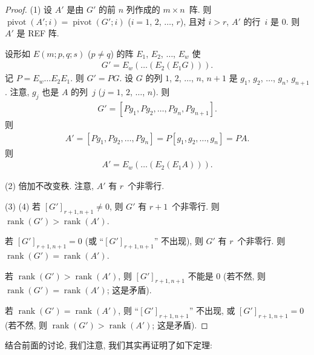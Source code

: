 \documentclass[../libro.tex]{subfiles}
\begin{document}
\begin{proof}
    (1)
    设 \(A'\) 是由 \(G'\) 的前 \(n\) 列作成的 \(m \times n\)~阵.
    则
    \(\operatorname{pivot} {(A'; i)} = \operatorname{pivot} {(G'; i)}\)
    (\(i = 1\), \(2\), \(\dots\), \(r\)),
    且对 \(i > r\),
    \(A'\) 的行~\(i\) 是 \(0\).
    则 \(A'\) 是 REF 阵.

    设形如 \(E(m; p, q; s)\) (\(p \neq q\)) 的阵
    \(E_1\), \(E_2\), \(\dots\), \(E_w\) 使
    \begin{align*}
        G' = E_w (\dots (E_2 (E_1 G))).
    \end{align*}
    记 \(P = E_w \dots E_2 E_1\).
    则 \(G' = P G\).
    设 \(G\) 的列
    \(1\), \(2\), \(\dots\), \(n\), \(n+1\)
    是 \(g_1\), \(g_2\), \(\dots\), \(g_n\), \(g_{n+1}\).
    注意, \(g_j\) 也是 \(A\) 的列~\(j\)
    (\(j = 1\), \(2\), \(\dots\), \(n\)).
    则
    \begin{align*}
        G' = [P g_1, P g_2, \dots, P g_n, P g_{n+1}].
    \end{align*}
    则
    \begin{align*}
        A'
        = [P g_1, P g_2, \dots, P g_n]
        = P [g_1, g_2, \dots, g_n]
        = P A.
    \end{align*}
    则
    \begin{align*}
        A' = E_w (\dots (E_2 (E_1 A))).
    \end{align*}

    (2)
    倍加不改变秩.
    注意, \(A'\) 有 \(r\)~个非零行.

    (3) (4)
    若 \([G']_{r+1,n+1} \neq 0\),
    则 \(G'\) 有 \(r + 1\)~个非零行.
    则 \(\operatorname{rank} {(G')} > \operatorname{rank} {(A')}\).

    若 \([G']_{r+1,n+1} = 0\)
    (或 ``\([G']_{r+1,n+1}\)'' 不出现),
    则 \(G'\) 有 \(r\)~个非零行.
    则 \(\operatorname{rank} {(G')} = \operatorname{rank} {(A')}\).

    若
    \(\operatorname{rank} {(G')} > \operatorname{rank} {(A')}\),
    则 \([G']_{r+1,n+1}\) 不能是 \(0\)
    (若不然, 则
        \(\operatorname{rank} {(G')} = \operatorname{rank} {(A')}\);
    这是矛盾).

    若
    \(\operatorname{rank} {(G')} = \operatorname{rank} {(A')}\),
    则 ``\([G']_{r+1,n+1}\)'' 不出现,
    或 \([G']_{r+1,n+1} = 0\)
    (若不然, 则
        \(\operatorname{rank} {(G')} > \operatorname{rank} {(A')}\);
    这是矛盾).
\end{proof}

结合前面的讨论, 我们注意,
我们其实再证明了如下定理:
\end{document}
